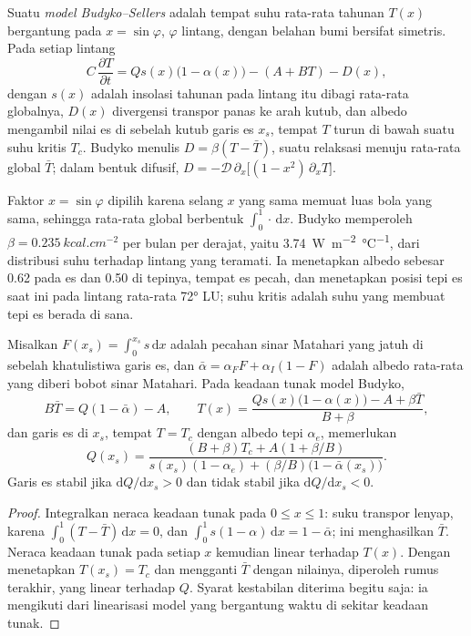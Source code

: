 \begin{definition}\label{def:b3:climate-models:budyko-sellers}
Suatu \emph{model Budyko--Sellers} adalah
 tempat suhu rata-rata tahunan $T(x)$ bergantung pada
$x = \sin\varphi$, $\varphi$ lintang, dengan belahan bumi bersifat simetris.
Pada setiap lintang
\[
C\,\frac{\partial T}{\partial t} = Qs(x)\big(1 - \alpha(x)\big) - (A + BT) - D(x) ,
\]
dengan $s(x)$ adalah insolasi tahunan pada lintang itu dibagi
rata-rata globalnya, $D(x)$ divergensi transpor panas ke arah kutub, dan albedo
mengambil nilai es di sebelah kutub garis es $x_s$, tempat $T$ turun di bawah suatu
suhu kritis $T_c$. Budyko menulis $D = \beta(T - \bar T)$, suatu
relaksasi menuju rata-rata global $\bar T$; dalam bentuk difusif, $D =
-\mathcal D\,\partial_x\big[(1 - x^2)\,\partial_xT\big]$.
\end{definition}

Faktor $x = \sin\varphi$ dipilih karena selang $x$ yang sama memuat
luas bola yang sama, sehingga rata-rata global berbentuk $\int_0^1\cdot\,\mathrm
dx$. Budyko memperoleh $\beta = \qty{0.235}{kcal.cm^{-2}}$ per bulan per
derajat, yaitu \qty{3.74}{W.m^{-2}.\celsius^{-1}}, dari distribusi
suhu terhadap lintang yang teramati. Ia menetapkan albedo sebesar 0.62 pada es dan 0.50 di tepinya,
tempat es pecah, dan menetapkan posisi tepi es saat ini pada lintang rata-rata
\ang{72} LU; suhu kritis adalah suhu yang membuat tepi es
berada di sana.

\begin{proposition}\label{prop:b3:climate-models:iceline}
Misalkan $F(x_s) = \int_0^{x_s}s\,\mathrm dx$ adalah pecahan sinar Matahari
yang jatuh di sebelah khatulistiwa garis es, dan $\bar\alpha = \alpha_FF + \alpha_I(1 -
F)$ adalah albedo rata-rata yang diberi bobot sinar Matahari. Pada keadaan tunak
model Budyko,
\[
B\bar T = Q(1 - \bar\alpha) - A, \qquad
T(x) = \frac{Qs(x)\big(1 - \alpha(x)\big) - A + \beta\bar T}{B + \beta} ,
\]
dan garis es di $x_s$, tempat $T = T_c$ dengan albedo tepi $\alpha_e$,
memerlukan
\[
Q(x_s) = \frac{(B + \beta)T_c + A(1 + \beta/B)}{s(x_s)(1 - \alpha_e) +
(\beta/B)\big(1 - \bar\alpha(x_s)\big)} .
\]
Garis es stabil jika $\mathrm dQ/\mathrm dx_s > 0$ dan
tidak stabil jika $\mathrm dQ/\mathrm dx_s < 0$.
\end{proposition}

\begin{proof}
Integralkan neraca keadaan tunak pada $0 \le x \le 1$: suku transpor
lenyap, karena $\int_0^1(T - \bar T)\,\mathrm dx = 0$, dan $\int_0^1
s(1 - \alpha)\,\mathrm dx = 1 - \bar\alpha$; ini menghasilkan $\bar T$. Neraca
keadaan tunak pada setiap $x$ kemudian linear terhadap $T(x)$. Dengan
menetapkan $T(x_s) = T_c$ dan mengganti $\bar T$ dengan nilainya, diperoleh rumus terakhir, yang linear terhadap $Q$.
Syarat kestabilan diterima begitu saja: ia mengikuti dari linearisasi
model yang bergantung waktu di sekitar keadaan tunak.
\end{proof}

